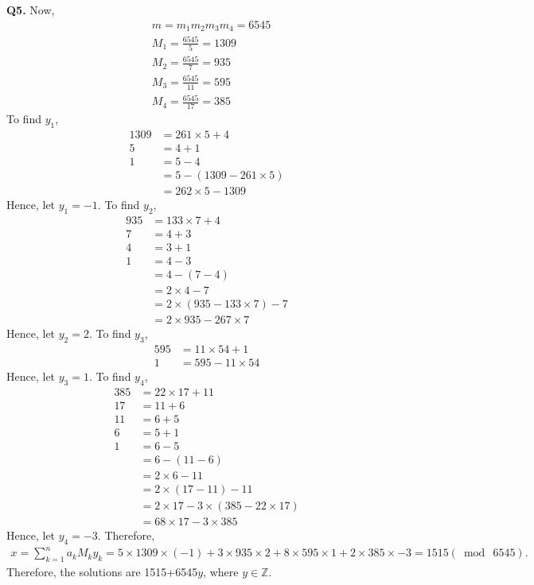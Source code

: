 \documentclass{article}[12pt]
\begin{document}
\noindent \textbf{Q5.}
Now, 
\begin{align*}
&m=m_1m_2m_3m_4=6545\\
&M_1=\frac{6545}{5}=1309\\
&M_2=\frac{6545}{7}=935\\
&M_3=\frac{6545}{11}=595\\
&M_4=\frac{6545}{17}=385
\end{align*}
To find $y_1$, 
\begin{align*}
1309&=261\times 5+4\\
5&=4+1\\
1&=5-4\\
&=5-(1309-261\times 5)\\
&=262\times 5-1309
\end{align*}
Hence, let $y_1=-1$. To find $y_2$, 
\begin{align*}
935&=133\times 7+4\\
7&=4+3\\
4&=3+1\\
1&=4-3\\
&=4-(7-4)\\
&=2\times 4-7\\
&=2\times (935-133\times 7)-7\\
&=2\times 935-267\times 7
\end{align*}
Hence, let $y_2=2$. To find $y_3$, 
\begin{align*}
595&=11\times 54+1\\
1&=595-11\times 54
\end{align*}
Hence, let $y_3=1$. To find $y_4$, 
\begin{align*}
385&=22\times 17+11\\
17&=11+6\\
11&=6+5\\
6&=5+1\\
1&=6-5\\
&=6-(11-6)\\
&=2\times 6-11\\
&=2\times (17-11)-11\\
&=2\times 17-3\times (385-22\times 17)\\
&=68\times 17-3\times 385
\end{align*}
Hence, let $y_4=-3$. Therefore, 
\begin{align*}
x=\sum_{k=1}^{n}a_kM_ky_k=5\times 1309\times (-1)+3\times 935\times 2+8\times 595\times 1+2\times 385\times -3=1515 (\bmod\ 6545). 
\end{align*}
Therefore, the solutions are 1515+6545$y$, where $y\in \mathbb{Z}$.
\\
\end{document}
